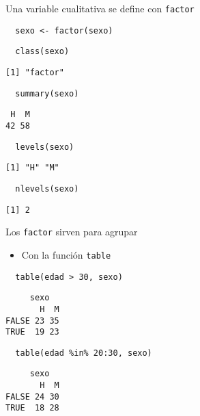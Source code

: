 \documentclass[xcolor={usenames,svgnames,dvipsnames}]{beamer}
\begin{document}
\begin{frame}[fragile,label=sec-1-2]{Una variable cualitativa se define con \texttt{factor}}
 \lstset{language=R,label= ,caption= ,numbers=none}
\begin{lstlisting}
  sexo <- factor(sexo)
\end{lstlisting}

\lstset{language=R,label= ,caption= ,numbers=none}
\begin{lstlisting}
  class(sexo)
\end{lstlisting}

\begin{verbatim}
[1] "factor"
\end{verbatim}

\lstset{language=R,label= ,caption= ,numbers=none}
\begin{lstlisting}
  summary(sexo)
\end{lstlisting}

\begin{verbatim}
 H  M 
42 58
\end{verbatim}

\lstset{language=R,label= ,caption= ,numbers=none}
\begin{lstlisting}
  levels(sexo)
\end{lstlisting}

\begin{verbatim}
[1] "H" "M"
\end{verbatim}

\lstset{language=R,label= ,caption= ,numbers=none}
\begin{lstlisting}
  nlevels(sexo)
\end{lstlisting}

\begin{verbatim}
[1] 2
\end{verbatim}
\end{frame}

\begin{frame}[fragile,label=sec-1-3]{Los \texttt{factor} sirven para agrupar}
 \begin{itemize}
\item Con la función \texttt{table}
\end{itemize}
\lstset{language=R,label= ,caption= ,numbers=none}
\begin{lstlisting}
  table(edad > 30, sexo)
\end{lstlisting}

\begin{verbatim}
     sexo
       H  M
FALSE 23 35
TRUE  19 23
\end{verbatim}

\lstset{language=R,label= ,caption= ,numbers=none}
\begin{lstlisting}
  table(edad %in% 20:30, sexo)
\end{lstlisting}

\begin{verbatim}
     sexo
       H  M
FALSE 24 30
TRUE  18 28
\end{verbatim}
\end{frame}
\end{document}
